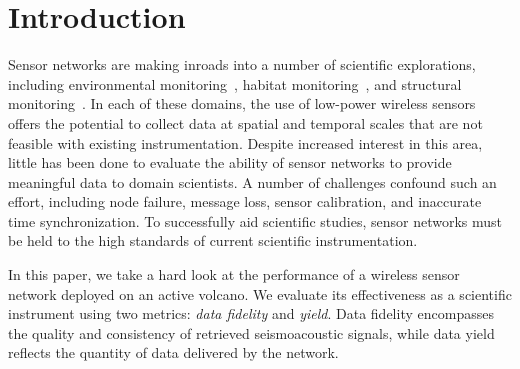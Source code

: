 \section{Introduction}


Sensor networks are making inroads into a number of scientific explorations,
including environmental
monitoring~\cite{rope-emnets05,berkeley-redwoods}, habitat
monitoring~\cite{cerpa-habitat,mainwaring-habitat,gdi-sensys04}, and
structural monitoring~\cite{ggb-monitoring,netshm-emnets05,wisan}.  
In each of these
domains, the use of low-power wireless sensors offers the potential to 
collect data at spatial and temporal scales that are 
not feasible with existing instrumentation.
Despite increased interest in this area, little has been done to
evaluate the ability of sensor networks to provide meaningful
data to domain scientists. A number of challenges confound such an effort,
including node failure, message loss, sensor calibration, and inaccurate time
synchronization. To successfully aid scientific studies, sensor networks
must be held to the high standards of 
current scientific instrumentation.


In this paper, we take a hard look at the performance of a wireless sensor
network deployed on an active volcano. We evaluate its effectiveness as a
scientific instrument using two metrics: {\em
data fidelity} and {\em yield}. Data fidelity encompasses the quality and
consistency of retrieved seismoacoustic signals, while data yield reflects
the quantity of data delivered by the network. 

